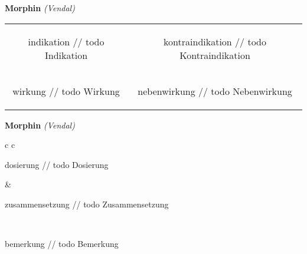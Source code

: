 \documentclass[12pt]{beamer}
\begin{document}
\begin{frame}{
    \textbf{Morphin}
    \textit{(Vendal)}
}
    \begin{tabular}{c c}
        \begin{beamercolorbox}[wd=\boxwidth\textwidth,ht=\boxheight\textheight,sep=1em]{indikation}
        // todo Indikation
        \end{beamercolorbox} & 
        \begin{beamercolorbox}[wd=\boxwidth\textwidth,ht=\boxheight\textheight,sep=1em]{kontraindikation}
        // todo Kontraindikation 
        \end{beamercolorbox} \\
        \begin{beamercolorbox}[wd=\boxwidth\textwidth,ht=\boxheight\textheight,sep=1em]{wirkung}
        // todo Wirkung
        \end{beamercolorbox} & 
        \begin{beamercolorbox}[wd=\boxwidth\textwidth,ht=\boxheight\textheight,sep=1em]{nebenwirkung}
        // todo Nebenwirkung
        \end{beamercolorbox} \\
    \end{tabular}
\end{frame}

\begin{frame}{
    \textbf{Morphin}
    \textit{(Vendal)}
}
    \begin{tabular}{c c}
        \begin{beamercolorbox}[wd=\boxwidth\textwidth,ht=\boxheight\textheight,sep=1em]{dosierung}
        // todo Dosierung
        \end{beamercolorbox} & 
        \begin{beamercolorbox}[wd=\boxwidth\textwidth,ht=\boxheight\textheight,sep=1em]{zusammensetzung}
        // todo Zusammensetzung
        \end{beamercolorbox} \\
        \begin{beamercolorbox}[wd=\textwidth,ht=\boxheight\textheight,sep=1em]{bemerkung}
        // todo Bemerkung
        \end{beamercolorbox} \\
    \end{tabular}
\end{frame}
\end{document}
